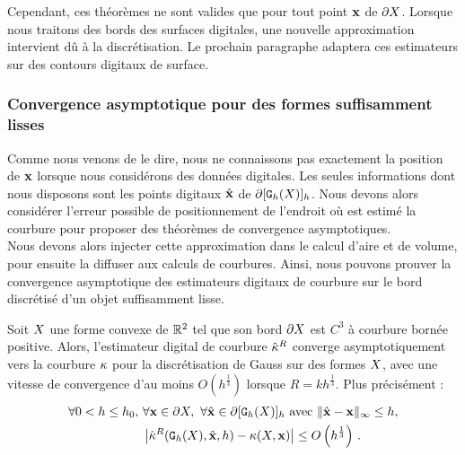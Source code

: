 %
Cependant, ces théorèmes ne sont valides que pour tout point $\mathbf{x}$ de $\partial X$.
Lorsque nous traitons des bords des surfaces digitales, une nouvelle
approximation intervient dû à la discrétisation. Le prochain paragraphe adaptera
ces estimateurs sur des contours digitaux de surface.
%
\subsubsection{Convergence asymptotique pour des formes suffisamment lisses}
%
Comme nous venons de le dire, nous ne connaissons pas exactement la position de
$\mathbf{x}$ lorsque nous considérons des données digitales. Les seules informations
dont nous disposons sont les points digitaux $\hat{\mathbf{x}}$ de $\partial \lbrack \mathtt{G}_{h}(X) \rbrack_{h}$.
Nous devons alors considérer l'erreur possible de positionnement de l'endroit où
est estimé la courbure pour proposer des théorèmes de convergence
asymptotiques.\\
%
Nous devons alors injecter cette approximation dans le calcul d'aire et de
volume, pour ensuite la diffuser aux calculs de courbures. Ainsi, nous pouvons
prouver la convergence asymptotique des estimateurs digitaux de courbure sur le
bord discrétisé d'un objet suffisamment lisse.
%
\begin{theorem} \label{thm:multigrid-convergence-curv}
%
Soit $X$ une forme convexe de $\mathbb{R}^2$ tel que son bord $\partial X$ est $C^3$ à
courbure bornée positive. Alors, l'estimateur digital de courbure $\hat{\kappa}^{R}$ converge
asymptotiquement vers la courbure $\kappa$ pour la discrétisation de Gauss sur
des formes $X$, avec une vitesse de convergence d'au moins
$O(h^\frac{1}{3})$ lorsque $R = kh^\frac{1}{3}$. Plus précisément :
%
\begin{align}
  \forall 0 < h \le h_0,\,\, & \forall \mathbf{x} \in \partial X,\,\,
  \forall \hat{\mathbf{x}} \in \partial \lbrack \mathtt{G}_{h}(X) \rbrack_{h} \text{~avec~} \| \hat{\mathbf{x}} -\mathbf{x}\|_\infty \le h, \nonumber \\
  & \left| \hat{\kappa}^{R}(\mathtt{G}_{h}(X), \hat{\mathbf{x}}, h) - \kappa(X, \mathbf{x}) \right| \le O\left(h^{\frac{1}{3}}\right)\,.
\end{align}
%
\end{theorem}
%

